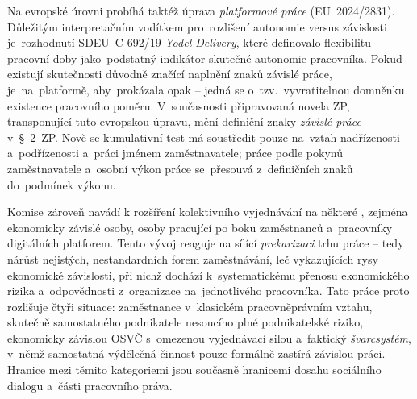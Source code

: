 Na evropské úrovni probíhá taktéž úprava \textit{platformové práce} (\acs{EU}~2024/2831). Důležitým interpretačním vodítkem pro~rozlišení autonomie versus závislosti je~rozhodnutí \acs{SDEU}~C-692/19 \emph{Yodel Delivery}, které definovalo flexibilitu pracovní doby jako~podstatný indikátor skutečné autonomie pracovníka. Pokud existují skutečnosti důvodně značící naplnění znaků závislé práce, je~na~platformě, aby~prokázala opak -- jedná se o~tzv.~vyvratitelnou domněnku existence pracovního poměru. V~současnosti připravovaná novela \acs{ZP}, transponující tuto evropskou úpravu, mění definiční znaky \textit{závislé práce} v~\S~2~\acs{ZP}. Nově se kumulativní test má soustředit pouze na~vztah nadřízenosti a~podřízenosti a~práci jménem zaměstnavatele; práce podle pokynů zaměstnavatele a~osobní výkon práce se~přesouvá z~definičních znaků do~podmínek výkonu.\par
Komise zároveň navádí k rozšíření kolektivního vyjednávání na některé , zejména ekonomicky závislé osoby, osoby pracující po boku zaměstnanců a~pracovníky digitálních platforem. Tento vývoj reaguje na sílící \textit{prekarizaci} trhu práce -- tedy nárůst nejistých, nestandardních forem zaměstnávání, leč vykazujících rysy ekonomické závislosti, při nichž dochází k~systematickému přenosu ekonomického rizika a~odpovědnosti z~organizace na~jednotlivého pracovníka. Tato práce proto rozlišuje čtyři situace: zaměstnance v~klasickém pracovněprávním vztahu, skutečně samostatného podnikatele nesoucího plné podnikatelské riziko, ekonomicky závislou \acs{OSVČ} s~omezenou vyjednávací silou a~faktický \textit{švarcsystém}, v~němž samostatná výdělečná činnost pouze formálně zastírá závislou práci. Hranice mezi těmito kategoriemi jsou současně hranicemi dosahu sociálního dialogu a~části pracovního práva.~\cite{MPSV_ZakonOdmenovani_2026}~\cite{EC_Guidelines_CB_SoloSelfEmployed_2022}\par